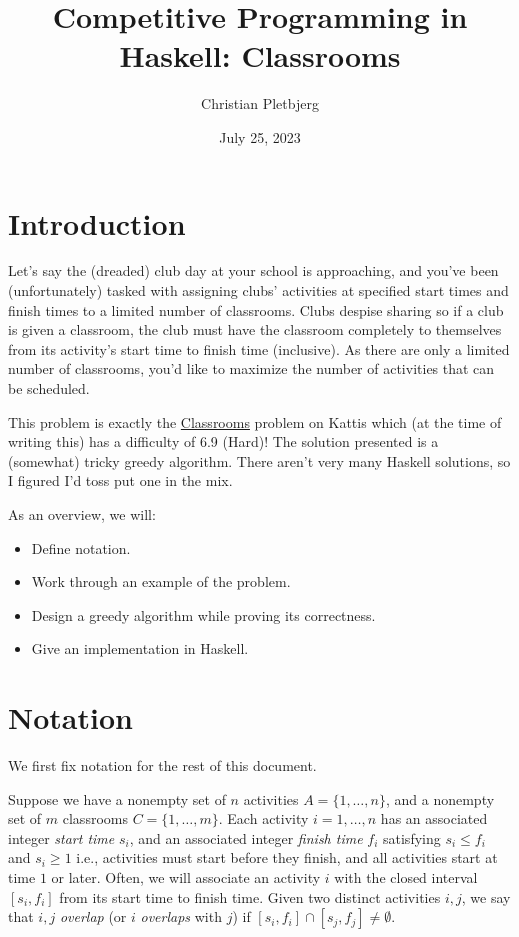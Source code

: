 \documentclass{article}
\title{Competitive Programming in Haskell: Classrooms}
\author{Christian Pletbjerg}
\date{July 25, 2023}
\theoremstyle{plain}%
\theoremstyle{definition}
\theoremstyle{remark}
\begin{document}
\maketitle

\tableofcontents

\section{Introduction}
Let's say the (dreaded) club day at your school is approaching, and you've been
    (unfortunately) tasked with assigning clubs' activities at specified start
    times and finish times to a limited number of classrooms.
Clubs despise sharing so if a club is given a classroom, the club must have the
    classroom completely to themselves from its activity's start time to finish
    time (inclusive).
As there are only a limited number of classrooms, you'd like to maximize
    the number of activities that can be scheduled.

This problem is exactly the
    \href{https://open.kattis.com/problems/classrooms}{Classrooms} problem on
    Kattis which (at the time of writing this) has a difficulty of 6.9 (Hard)!
The solution presented is a (somewhat) tricky greedy algorithm.
There aren't very many Haskell solutions, so I figured I'd toss put one in
    the mix.

As an overview, we will:
\begin{itemize}
    \item Define notation.
    \item Work through an example of the problem.
    \item Design a greedy algorithm while proving its correctness.
    \item Give an implementation in Haskell.
\end{itemize}

\section{Notation}
We first fix notation for the rest of this document.

Suppose we have a nonempty set of $n$ activities $A = \{1,\dots,n\}$, 
    and a nonempty set of $m$ classrooms $C = \{1,\dots,m\}$.
Each activity $i = 1,\dots, n$ has an associated integer \emph{start time} $s_i$, and
    an associated integer \emph{finish time} $f_i$ satisfying $s_i \le f_i$ and $s_i \ge 1$ 
    i.e., activities must start before they finish, and all activities start
    at time $1$ or later.
Often, we will associate an activity $i$ with the closed interval $[s_i,f_i]$
    from its start time to finish time.
Given two distinct activities $i,j$, we say that $i,j$ \emph{overlap} (or $i$
    \emph{overlaps} with $j$) if $[s_i, f_i] \cap [s_j,f_j] \neq \emptyset$.
\end{document}
